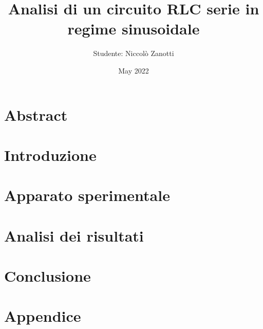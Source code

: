 \documentclass[12pt]{article}
\title{Analisi di un circuito RLC serie in regime sinusoidale}
\author{Studente: Niccolò Zanotti}
\date{May 2022}
\begin{document}
 \maketitle
 \hrulefill

 \section{Abstract}
    
 \section{Introduzione}
   
 \section{Apparato sperimentale}
   
 \section{Analisi dei risultati}
   
 \section{Conclusione}
  
 \section{Appendice}
   
 
\end{document}
